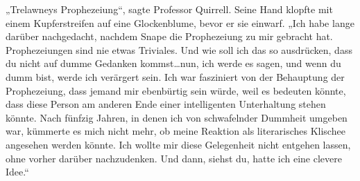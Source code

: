 „Trelawneys Prophezeiung“, sagte Professor Quirrell.
Seine Hand klopfte mit einem Kupferstreifen auf eine Glockenblume, bevor er sie einwarf. „Ich habe lange darüber nachgedacht, nachdem Snape die Prophezeiung zu mir gebracht hat. Prophezeiungen sind nie etwas Triviales. Und wie soll ich das so ausdrücken, dass du nicht auf dumme Gedanken kommst…nun, ich werde es sagen, und wenn du dumm bist, werde ich verärgert sein. Ich war fasziniert von der Behauptung der Prophezeiung, dass jemand mir ebenbürtig sein würde, weil es bedeuten könnte, dass diese Person am anderen Ende einer intelligenten Unterhaltung stehen könnte. Nach fünfzig Jahren, in denen ich von schwafelnder Dummheit umgeben war, kümmerte es mich nicht mehr, ob meine Reaktion als literarisches Klischee angesehen werden könnte. Ich wollte mir diese Gelegenheit nicht entgehen lassen, ohne vorher darüber nachzudenken. Und dann, siehst du, hatte ich eine clevere Idee.“
